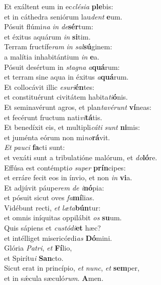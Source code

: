 \evenverse Et exáltent eum in ec\textit{clé}\textit{si}\textit{a} \textbf{ple}bis:~\*\\
\evenverse et in cáthedra seniórum lau\textit{dent} \textbf{e}um.\\
\oddverse Pósuit flúmi\textit{na} \textit{in} \textit{de}\textbf{sér}tum:~\*\\
\oddverse et éxitus aquárum \textit{in} \textbf{si}tim.\\
\evenverse Terram fructífe\textit{ram} \textit{in} \textit{sal}\textbf{sú}ginem:~\*\\
\evenverse a malítia inhabitántium \textit{in} \textbf{e}a.\\
\oddverse Pósuit desértum in \textit{sta}\textit{gna} \textit{a}\textbf{quá}rum:~\*\\
\oddverse et terram sine aqua in éxitus \textit{a}\textbf{quá}rum.\\
\evenverse Et collocávit illic \textit{e}\textit{su}\textit{ri}\textbf{én}tes:~\*\\
\evenverse et constituérunt civitátem habita\textit{ti}\textbf{ó}nis.\\
\oddverse Et seminavérunt agros, et plan\textit{ta}\textit{vé}\textit{runt} \textbf{ví}neas:~\*\\
\oddverse et fecérunt fructum nati\textit{vi}\textbf{tá}tis.\\
\evenverse Et benedíxit eis, et multipli\textit{cá}\textit{ti} \textit{sunt} \textbf{ni}mis:~\*\\
\evenverse et juménta eórum non mi\textit{no}\textbf{rá}vit.\\
\oddverse \textit{Et} \textit{pau}\textit{ci} \textbf{fa}cti sunt:~\*\\
\oddverse et vexáti sunt a tribulatióne malórum, et \textit{do}\textbf{ló}re.\\
\evenverse Effúsa est contémpti\textit{o} \textit{su}\textit{per} \textbf{prín}cipes:~\*\\
\evenverse et erráre fecit eos in ínvio, et non \textit{in} \textbf{vi}a.\\
\oddverse Et adjúvit páupe\textit{rem} \textit{de} \textit{i}\textbf{nó}pia:~\*\\
\oddverse et pósuit sicut oves \textit{fa}\textbf{mí}lias.\\
\evenverse Vidébunt recti, \textit{et} \textit{læ}\textit{ta}\textbf{bún}tur:~\*\\
\evenverse et omnis iníquitas oppilábit \textit{os} \textbf{su}um.\\
\oddverse Quis sápiens et \textit{cu}\textit{stó}\textit{di}\textbf{et} hæc?~\*\\
\oddverse et intélliget misericórdi\textit{as} \textbf{Dó}mini.\\
\evenverse Glória \textit{Pa}\textit{tri}, \textit{et} \textbf{Fí}lio,~\*\\
\evenverse et Spirítu\textit{i} \textbf{San}cto.\\
\oddverse Sicut erat in princípio, \textit{et} \textit{nunc}, \textit{et} \textbf{sem}per,~\*\\
\oddverse et in sǽcula sæculó\textit{rum}. \textbf{A}men.\\
